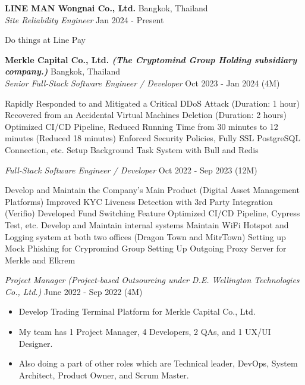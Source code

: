 \textbf{LINE MAN Wongnai Co., Ltd.} \hfill Bangkok, Thailand\\
\textit{Site Reliability Engineer} \hfill Jan 2024 - Present\\
\vspace{-1mm}
\begin{outline}
	\1 Do things at Line Pay
\end{outline}
\vspace{-1mm}
\textbf{Merkle Capital Co., Ltd. \textit{\tiny{(The Cryptomind Group Holding subsidiary company.)}}} \hfill Bangkok, Thailand\\
\textit{Senior Full-Stack Software Engineer / Developer} \hfill Oct 2023 - Jan 2024 (4M)\\
\vspace{-1mm}
\begin{outline}
	\1 Rapidly Responded to and Mitigated a Critical DDoS Attack (Duration: 1 hour)
	\1 Recovered from an Accidental Virtual Machines Deletion (Duration: 2 hours)
	\1 Optimized CI/CD Pipeline, Reduced Running Time from 30 minutes to 12 minutes (Reduced 18 minutes)
	\1 Enforced Security Policies, Fully SSL PostgreSQL Connection, etc.
	\1 Setup Background Task System with Bull and Redis
\end{outline}
\vspace{-1mm}
\textit{Full-Stack Software Engineer / Developer} \hfill Oct 2022 - Sep 2023 (12M)\\
\vspace{-1mm}
\begin{outline}
	\1 Develop and Maintain the Company's Main Product (Digital Asset Management Platforms)
		\2 Improved KYC Liveness Detection with 3rd Party Integration (Verifio)
		\2 Developed Fund Switching Feature
		\2 Optimized CI/CD Pipeline, Cypress Test, etc.
	\1 Develop and Maintain internal systems
		\2 Maintain WiFi Hotspot and Logging system at both two offices (Dragon Town and MitrTown)
		\2 Setting up Mock Phishing for Crypromind Group
		\2 Setting Up Outgoing Proxy Server for Merkle and Elkrem
\end{outline}
\vspace{-1mm}
\textit{Project Manager} \textit{\tiny (Project-based Outsourcing under D.E. Wellington Technologies Co., Ltd.)} \hfill June 2022 - Sep 2022 (4M)\\
\vspace{-1mm}
\begin{itemize}
	\item Develop Trading Terminal Platform for Merkle Capital Co., Ltd.
	\item My team has 1 Project Manager, 4 Developers, 2 QAs, and 1 UX/UI Designer.
	\item Also doing a part of other roles which are Technical leader, DevOps, System Architect, Product Owner, and Scrum Master.
\end{itemize}
